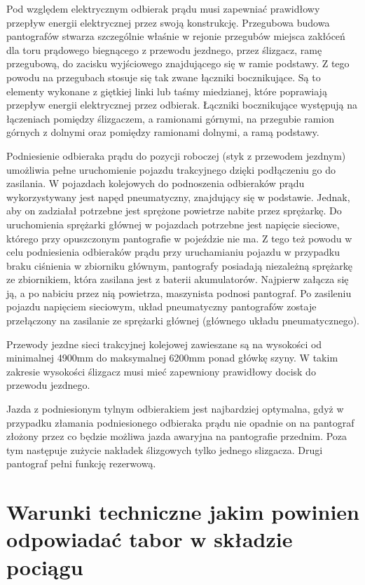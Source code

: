 Pod względem elektrycznym odbierak prądu musi zapewniać prawidłowy przepływ energii elektrycznej przez swoją konstrukcję. Przegubowa budowa pantografów stwarza szczególnie właśnie w rejonie przegubów miejsca zakłóceń dla toru prądowego biegnącego z przewodu jezdnego, przez ślizgacz, ramę przegubową, do zacisku wyjściowego znajdującego się w ramie podstawy. Z tego powodu na przegubach stosuje się tak zwane łączniki bocznikujące. Są to elementy wykonane z giętkiej linki lub taśmy miedzianej, które poprawiają przepływ energii elektrycznej przez odbierak. Łączniki bocznikujące występują na łączeniach pomiędzy ślizgaczem, a ramionami górnymi, na przegubie ramion górnych z dolnymi oraz pomiędzy ramionami dolnymi, a ramą podstawy. 

Podniesienie odbieraka prądu do pozycji roboczej (styk z przewodem jezdnym) umożliwia pełne uruchomienie pojazdu trakcyjnego dzięki podłączeniu go do zasilania. W pojazdach kolejowych do podnoszenia odbieraków prądu wykorzystywany jest napęd pneumatyczny, znajdujący się w podstawie. Jednak, aby on zadziałał potrzebne jest sprężone powietrze nabite przez sprężarkę. Do uruchomienia sprężarki głównej w pojazdach potrzebne jest napięcie sieciowe, którego przy opuszczonym pantografie w pojeździe nie ma. Z tego też powodu w celu podniesienia odbieraków prądu przy uruchamianiu pojazdu w przypadku braku ciśnienia w zbiorniku głównym, pantografy posiadają niezależną sprężarkę ze zbiornikiem, która zasilana jest z baterii akumulatorów. Najpierw załącza się ją, a po nabiciu przez nią powietrza, maszynista podnosi pantograf. Po zasileniu pojazdu napięciem sieciowym, układ pneumatyczny pantografów zostaje przełączony na zasilanie ze sprężarki głównej (głównego układu pneumatycznego). 

Przewody jezdne sieci trakcyjnej kolejowej zawieszane są na wysokości od minimalnej 4900mm do maksymalnej 6200mm ponad główkę szyny. W takim zakresie wysokości ślizgacz musi mieć zapewniony prawidłowy docisk do przewodu jezdnego.

Jazda z podniesionym tylnym odbierakiem jest najbardziej optymalna, gdyż w przypadku złamania podniesionego odbieraka prądu nie opadnie on na pantograf złożony przez co będzie możliwa jazda awaryjna na pantografie przednim. Poza tym następuje zużycie nakładek ślizgowych tylko jednego slizgacza. Drugi pantograf pełni funkcję rezerwową. 

\section{Warunki techniczne jakim powinien odpowiadać tabor w składzie pociągu}


